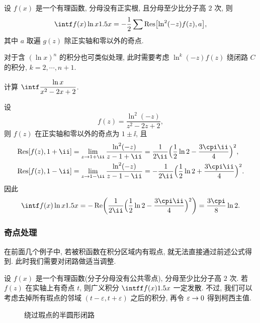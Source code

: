 \begin{theorem}
  设 $f(x)$ 是一个有理函数, 分母没有正实根, 且分母至少比分子高 $2$ 次, 则
  \[
    \intf f(x)\ln x\d x
    =-\frac12 \sum \Res\bigl[\ln^2(-z)f(z),a\bigr],
  \]
  其中 $a$ 取遍 $g(z)$ 除正实轴和零以外的奇点.
\end{theorem}
对于含 $(\ln x)^n$ 的积分也可类似处理, 此时需要考虑 $\ln^k(-z)f(z)$ 绕闭路 $C$ 的积分, $k=2,\cdots,n+1$.

\begin{exercise}
  计算 $\intf\dfrac{\ln x}{x^2-2x+2}$.
\end{exercise}


\begin{solution}
  设
  \[
    f(z)=\frac{\ln^2(-z)}{z^2-2z+2},
  \]
  则 $f(z)$ 在正实轴和零以外的奇点为 $1\pm\ii$,
  且
  \begin{align*}
     \Res[f(z),1+\ii]&
    =\lim_{z\ra 1+\ii}\frac{\ln^2(-z)}{z-1+\ii}
    =\frac1{2\ii}\Bigl(\frac12\ln2-\frac{3\cpi\ii}4\Bigr)^2,
    \\
     \Res[f(z),1-\ii]&
    =\lim_{z\ra 1-\ii}\frac{\ln^2(-z)}{z-1-\ii}
    =-\frac1{2\ii}\Bigl(\frac12\ln2+\frac{3\cpi\ii}4\Bigr)^2.
  \end{align*}
  因此
  \[
     \intf f(x)\ln x\d x
    =-\Re\biggl(\frac1{2\ii}\Bigl(\frac12\ln2-\frac{3\cpi\ii}4\Bigr)^2\biggr)
    =\frac{3\cpi}8\ln2.
  \]
\end{solution}


\subsubsection{奇点处理}
在前面几个例子中, 若被积函数在积分区域内有瑕点, 就无法直接通过前述公式得到.
此时我们需要对闭路做适当调整.

设 $f(x)$ 是一个有理函数(分子分母没有公共零点), 分母至少比分子高 $2$ 次.
若 $f(z)$ 在实轴上有奇点 $t$, 则广义积分 $\intff f(x)\d x$ 一定发散.
不过, 我们可以考虑去掉所有瑕点的邻域 $(t-\varepsilon,t+\varepsilon)$ 之后的积分, 再令 $\varepsilon\rightarrow 0$ 得到柯西主值.

\begin{figure}[!htb]
  \centering
  \caption{绕过瑕点的半圆形闭路}
  \label{fig:half-circle-remove-singular-contour}
\end{figure}

